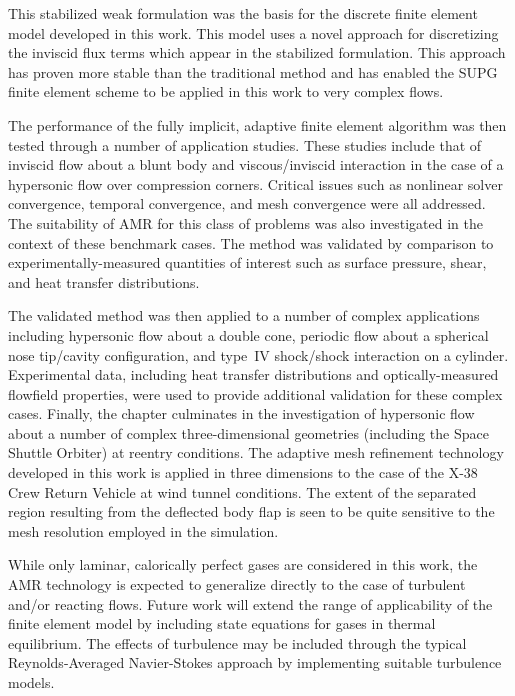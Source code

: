This stabilized weak formulation was the basis for the discrete finite element model developed in this work.  This model uses a novel approach for discretizing the inviscid flux terms which appear in the stabilized formulation.  This approach has proven more stable than the traditional method and has enabled the SUPG finite element scheme to be applied in this work to very complex flows.

The performance of the fully implicit, adaptive finite element algorithm was then tested through a number of application studies.  These studies include that of inviscid flow about a blunt body and viscous/inviscid interaction in the case of a hypersonic flow over compression corners.  Critical issues such as nonlinear solver convergence, temporal convergence, and mesh convergence were all addressed.  The suitability of AMR for this class of problems was also investigated in the context of these benchmark cases.  The method was validated by comparison to experimentally-measured quantities of interest such as surface pressure, shear, and heat transfer distributions.

The validated method was then applied to a number of complex applications including hypersonic flow about a double cone, periodic flow about a spherical nose tip/cavity configuration, and type~IV shock/shock interaction on a cylinder.  Experimental data, including heat transfer distributions and optically-measured flowfield properties, were used to provide additional validation for these complex cases.  Finally, the chapter culminates in the investigation of hypersonic flow about a number of complex three-dimensional geometries (including the Space Shuttle Orbiter) at reentry conditions.  The adaptive mesh refinement technology developed in this work is applied in three dimensions to the case of the X-38 Crew Return Vehicle at wind tunnel conditions.  The extent of the separated region resulting from the deflected body flap is seen to be quite sensitive to the mesh resolution employed in the simulation.

While only laminar, calorically perfect gases are considered in this work, the AMR technology is expected to generalize directly to the case of turbulent and/or reacting flows.  Future work will extend the range of applicability of the finite element model by including state equations for gases in thermal equilibrium.  The effects of turbulence may be included through the typical Reynolds-Averaged Navier-Stokes approach by implementing suitable turbulence models.

